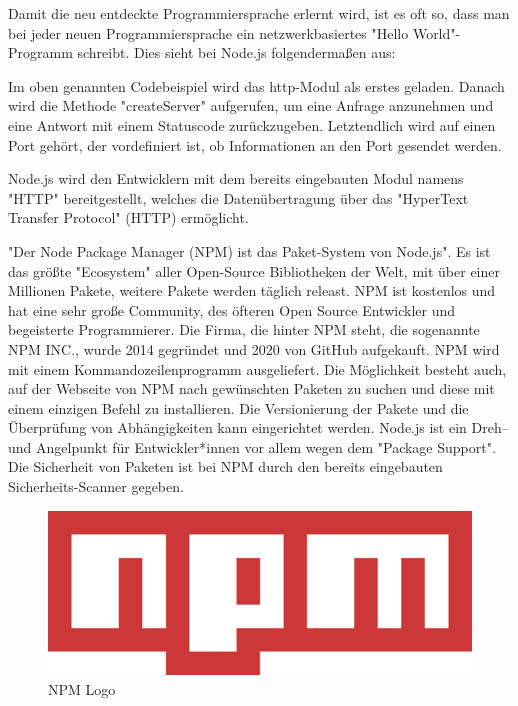 
Damit die neu entdeckte Programmiersprache erlernt wird, ist es oft so, dass man bei jeder neuen Programmiersprache ein netzwerkbasiertes "Hello World"-Programm schreibt. Dies sieht bei Node.js folgendermaßen aus:


Im oben genannten Codebeispiel wird das http-Modul als erstes geladen. Danach wird die Methode "createServer" aufgerufen, um eine Anfrage anzunehmen und eine Antwort mit einem Statuscode zurückzugeben. Letztendlich wird auf einen Port gehört, der vordefiniert ist, ob Informationen an den Port gesendet werden.

Node.js wird den Entwicklern mit dem bereits eingebauten Modul namens "HTTP" bereitgestellt, welches die Datenübertragung über das "HyperText Transfer Protocol" (HTTP) ermöglicht. \cite{HelloWorld}

\label{sec:npm}

"Der Node Package Manager (NPM) ist das Paket-System von Node.js". \cite{NPMIntro} Es ist das größte "Ecosystem" aller Open-Source Bibliotheken der Welt, mit über einer Millionen Pakete, weitere Pakete werden täglich releast. NPM ist kostenlos und hat eine sehr große Community, des öfteren Open Source Entwickler und begeisterte Programmierer. Die Firma, die hinter NPM steht, die sogenannte NPM INC., wurde 2014 gegründet und 2020 von GitHub aufgekauft.
NPM wird mit einem Kommandozeilenprogramm ausgeliefert. Die Möglichkeit besteht auch, auf der Webseite von NPM nach gewünschten Paketen zu suchen und diese mit einem einzigen Befehl zu installieren. Die Versionierung der Pakete und die Überprüfung von Abhängigkeiten kann eingerichtet werden. Node.js ist ein Dreh– und Angelpunkt für Entwickler*innen vor allem wegen dem "Package Support".
Die Sicherheit von Paketen ist bei NPM durch den bereits eingebauten Sicherheits-Scanner gegeben\cite{NPM}\cite{NPM2}\cite{NPMIntro}.

\begin{figure}[H]
    \centering
    \includegraphics{media/NodeJs/NPM.png}
    \caption{NPM Logo \cite{NPMLOGO}}
\end{figure}

